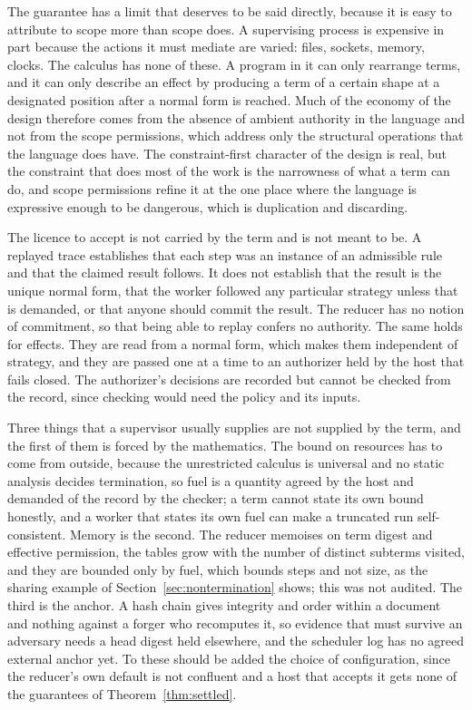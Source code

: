 \documentclass[11pt]{article}
\theoremstyle{definition}
\theoremstyle{remark}
\begin{document}
The guarantee has a limit that deserves to be said directly, because it is easy to attribute to scope more than scope does. A supervising process is expensive in part because the actions it must mediate are varied: files, sockets, memory, clocks. The calculus has none of these. A program in it can only rearrange terms, and it can only describe an effect by producing a term of a certain shape at a designated position after a normal form is reached. Much of the economy of the design therefore comes from the absence of ambient authority in the language and not from the scope permissions, which address only the structural operations that the language does have. The constraint-first character of the design is real, but the constraint that does most of the work is the narrowness of what a term can do, and scope permissions refine it at the one place where the language is expressive enough to be dangerous, which is duplication and discarding.

The licence to accept is not carried by the term and is not meant to be. A replayed trace establishes that each step was an instance of an admissible rule and that the claimed result follows. It does not establish that the result is the unique normal form, that the worker followed any particular strategy unless that is demanded, or that anyone should commit the result. The reducer has no notion of commitment, so that being able to replay confers no authority. The same holds for effects. They are read from a normal form, which makes them independent of strategy, and they are passed one at a time to an authorizer held by the host that fails closed. The authorizer's decisions are recorded but cannot be checked from the record, since checking would need the policy and its inputs.

Three things that a supervisor usually supplies are not supplied by the term, and the first of them is forced by the mathematics. The bound on resources has to come from outside, because the unrestricted calculus is universal and no static analysis decides termination, so fuel is a quantity agreed by the host and demanded of the record by the checker; a term cannot state its own bound honestly, and a worker that states its own fuel can make a truncated run self-consistent. Memory is the second. The reducer memoises on term digest and effective permission, the tables grow with the number of distinct subterms visited, and they are bounded only by fuel, which bounds steps and not size, as the sharing example of Section~\ref{sec:nontermination} shows; this was not audited. The third is the anchor. A hash chain gives integrity and order within a document and nothing against a forger who recomputes it, so evidence that must survive an adversary needs a head digest held elsewhere, and the scheduler log has no agreed external anchor yet. To these should be added the choice of configuration, since the reducer's own default is not confluent and a host that accepts it gets none of the guarantees of Theorem~\ref{thm:settled}.
\end{document}

